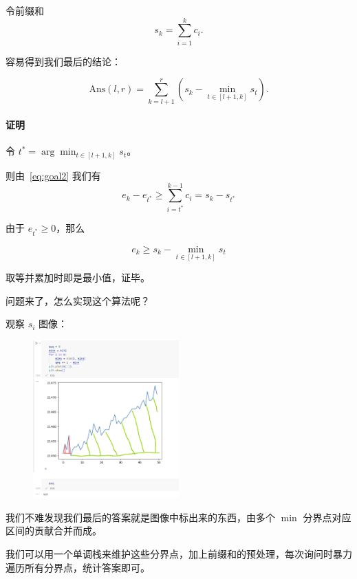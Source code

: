 \documentclass[14pt,a4paper]{article}
\begin{document}
令前缀和
\begin{equation}
    s_k = \sum_{i=1}^{k} c_i.
\end{equation}

容易得到我们最后的结论：

\begin{equation}
    \text{Ans}(l,r) = \sum_{k=l+1}^{r} (s_k - \min_{t \in [l+1, k]} s_t).
    \label{eq:ans}
\end{equation}

\paragraph{证明}

令 $t^* = \arg \min_{t\in[l+1,k]} s_t$。

则由~\eqref{eq:goal2} 我们有
\begin{equation}
    e_k - e_{t^*} \ge \sum_{i=t^*}^{k-1} c_i = s_k - s_{t^*}
\end{equation}

由于 $e_{t^*} \ge 0$，那么

\begin{equation}
    e_k \ge s_k - \min_{t\in[l+1,k]} s_t
\end{equation}

取等并累加时即是最小值，证毕。

问题来了，怎么实现这个算法呢？

观察 $s_i$ 图像：

\begin{figure}[H]
    \centering
    \includegraphics[width=0.5\textwidth]{image.png}
\end{figure}

我们不难发现我们最后的答案就是图像中标出来的东西，由多个 $\min$ 分界点对应区间的贡献合并而成。

我们可以用一个单调栈来维护这些分界点，加上前缀和的预处理，每次询问时暴力遍历所有分界点，统计答案即可。
\end{document}

